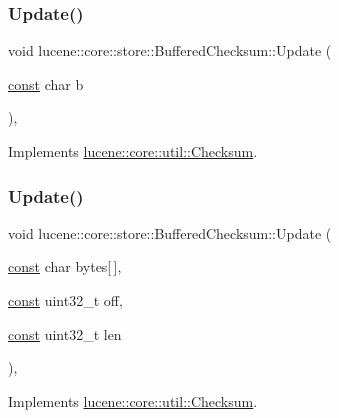 \subsubsection{\texorpdfstring{Update()}{Update()}\hspace{0.1cm}{\footnotesize\ttfamily [1/2]}}
{\footnotesize\ttfamily void lucene\+::core\+::store\+::\+Buffered\+Checksum\+::\+Update (\begin{DoxyParamCaption}\item[{\mbox{\hyperlink{ZlibCrc32_8h_a2c212835823e3c54a8ab6d95c652660e}{const}} char}]{b }\end{DoxyParamCaption})\hspace{0.3cm}{\ttfamily [inline]}, {\ttfamily [virtual]}}



Implements \mbox{\hyperlink{classlucene_1_1core_1_1util_1_1Checksum_a7c6a70391ed64a38eb6f3db43876f652}{lucene\+::core\+::util\+::\+Checksum}}.

\mbox{\label{classlucene_1_1core_1_1store_1_1BufferedChecksum_aca5120e922ed6723c768d899c91522f4}} 
\subsubsection{\texorpdfstring{Update()}{Update()}\hspace{0.1cm}{\footnotesize\ttfamily [2/2]}}
{\footnotesize\ttfamily void lucene\+::core\+::store\+::\+Buffered\+Checksum\+::\+Update (\begin{DoxyParamCaption}\item[{\mbox{\hyperlink{ZlibCrc32_8h_a2c212835823e3c54a8ab6d95c652660e}{const}} char}]{bytes\mbox{[}$\,$\mbox{]},  }\item[{\mbox{\hyperlink{ZlibCrc32_8h_a2c212835823e3c54a8ab6d95c652660e}{const}} uint32\+\_\+t}]{off,  }\item[{\mbox{\hyperlink{ZlibCrc32_8h_a2c212835823e3c54a8ab6d95c652660e}{const}} uint32\+\_\+t}]{len }\end{DoxyParamCaption})\hspace{0.3cm}{\ttfamily [inline]}, {\ttfamily [virtual]}}



Implements \mbox{\hyperlink{classlucene_1_1core_1_1util_1_1Checksum_aab3bdd13efe91e6e582b56fd64a304b6}{lucene\+::core\+::util\+::\+Checksum}}.



